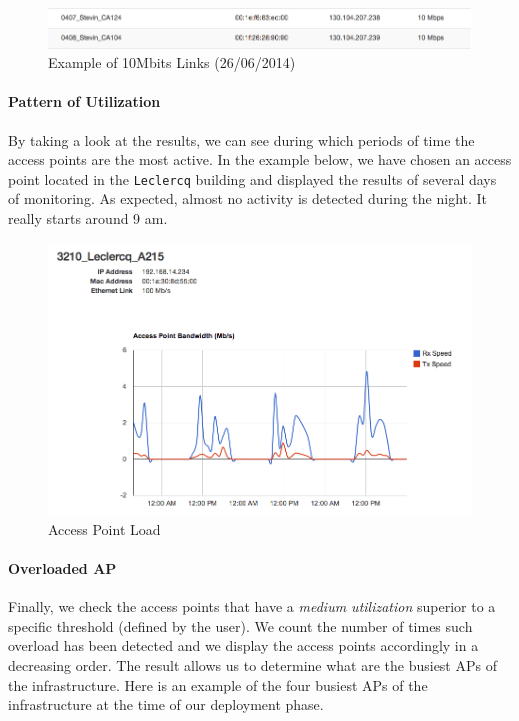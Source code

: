 \begin{figure}[H]
   \includegraphics[width=\textwidth]{Pictures/chapter5/slowLinks.png}
   \caption{Example of 10Mbits Links (26/06/2014)}
\end{figure}

\paragraph*{Pattern of Utilization} By taking a look at the results, we can see during which periods of time the access points are the most active. In the example below, we have chosen an access point located in the \texttt{Leclercq} building and displayed the results of several days of monitoring. As expected, almost no activity is detected during the night. It really starts around 9 am. 

\begin{figure}[H]
   \includegraphics[width=\textwidth]{Pictures/chapter5/apLoad.png}
   \caption{Access Point Load}
\end{figure}

\paragraph*{Overloaded AP} Finally, we check the access points that have a \emph{medium utilization} superior to a specific threshold (defined by the user). We count the number of times such overload has been detected and we display the access points accordingly in a decreasing order. The result allows us to determine what are the busiest APs of the infrastructure. Here is an example of the four busiest APs of the infrastructure at the time of our deployment phase.

